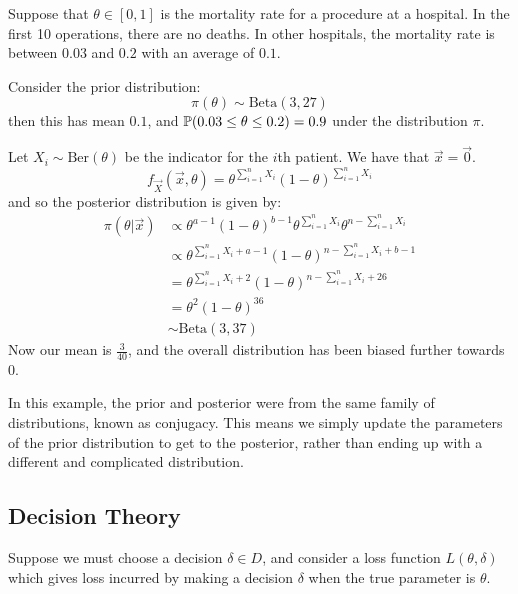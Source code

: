 \documentclass[../Main.tex]{subfiles}
\begin{document}
\begin{example}
    Suppose that $\theta \in [0, 1]$ is the mortality rate for a procedure at a hospital. In the first 10 operations, there are no deaths. In other hospitals, the mortality rate is between $0.03$ and $0.2$ with an average of $0.1$.

    Consider the prior distribution:
    \begin{equation*}
        \pi(\theta) \sim \text{Beta}(3, 27)
    \end{equation*}
    then this has mean $0.1$, and $\P(0.03 \leq \theta \leq 0.2) = 0.9$ under the distribution $\pi$.

    Let $X_i \sim \text{Ber}(\theta)$ be the indicator for the $i$th patient. We have that $\vec{x} = \vec0$.
    \begin{equation*}
        f_{\vec{X}}(\vec{x}, \theta) = \theta^{\sum_{i=1}^n X_i} (1-\theta)^{\sum_{i=1}^{n} X_i}
    \end{equation*}
    and so the posterior distribution is given by:
    \begin{align*}
        \pi(\theta | \vec{x}) &\propto \theta^{a-1} (1-\theta)^{b-1} \theta^{\sum_{i=1}^{n} X_i} \theta^{n-\sum_{i=1}^{n} X_i} \\
        &\propto \theta^{\sum_{i=1}^{n} X_i + a - 1} (1 - \theta)^{n - \sum_{i=1}^{n} X_i + b - 1} \\
        &= \theta^{\sum_{i=1}^{n} X_i + 2} (1 - \theta)^{n - \sum_{i=1}^{n} X_i + 26} \\
        &= \theta^{2} (1 - \theta)^{36} \\
        &\sim \text{Beta}(3, 37)
    \end{align*}
    Now our mean is $\frac{3}{40}$, and the overall distribution has been biased further towards 0.

    In this example, the prior and posterior were from the same family of distributions, known as conjugacy. This means we simply update the parameters of the prior distribution to get to the posterior, rather than ending up with a different and complicated distribution.
\end{example}
\subsection{Decision Theory}
Suppose we must choose a decision $\delta \in D$, and consider a loss function $L(\theta, \delta)$ which gives loss incurred by making a decision $\delta$ when the true parameter is $\theta$.
\end{document}
